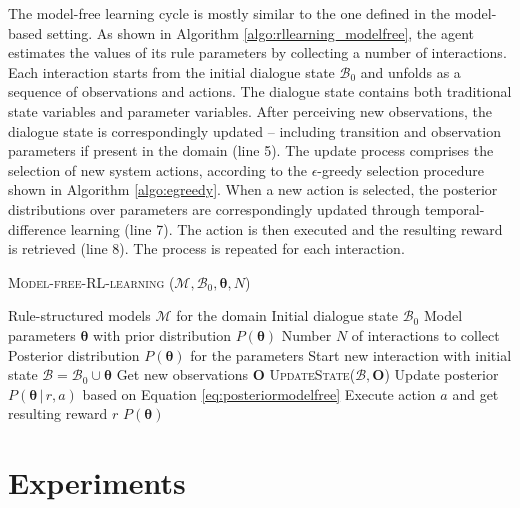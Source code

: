 The model-free learning cycle is mostly similar to the one defined in the model-based setting.  As shown in Algorithm \ref{algo:rllearning_modelfree}, the agent estimates the values of its rule parameters by collecting a number of interactions.  Each interaction starts from the initial dialogue state $\mathcal{B}_0$ and unfolds as a sequence of observations and actions.  The dialogue state contains both traditional state variables and parameter variables.  After perceiving new observations, the dialogue state is correspondingly updated -- including transition and observation parameters if present in the domain (line 5).  The update process comprises the selection of new system actions, according to the $\epsilon$-greedy selection procedure shown in Algorithm \ref{algo:egreedy}. When a new action is selected, the posterior distributions over parameters are correspondingly updated through temporal-difference learning (line 7). The action is then executed and the resulting reward is retrieved (line 8).  The process is repeated for each interaction. 


\begin{algorithm}[ht]
\caption{\textsc{Model-free-RL-learning} ($\mathcal{M}, \mathcal{B}_0, \boldsymbol\theta, N$)}
\begin{algorithmic}[1]\vspace{1mm}
\REQUIRE Rule-structured models $\mathcal{M}$ for the domain
\REQUIRE Initial dialogue state $\mathcal{B}_0$
\REQUIRE Model parameters $\boldsymbol\theta$ with prior distribution $P(\boldsymbol\theta)$
\REQUIRE Number $N$ of interactions to collect
\ENSURE Posterior distribution $P(\boldsymbol\theta)$ for the parameters  \vspace{1mm}
\STATE Start new interaction with initial state $\mathcal{B} = \mathcal{B}_0 \cup \boldsymbol\theta $
\STATE Get new observations $\mathbf{O}$
\STATE \textsc{UpdateState}($\mathcal{B}, \mathbf{O}$)
\STATE Update posterior $P(\boldsymbol\theta \, | \, r, a)$ based on Equation \eqref{eq:posteriormodelfree}
\STATE Execute action $a$ and get resulting reward $r$
\ENDIF
\ENDWHILE
\ENDFOR
\RETURN $P(\boldsymbol\theta)$
\end{algorithmic} 
\label{algo:rllearning_modelfree}
\end{algorithm}


\section{Experiments}
\label{sec:rllearning-experiments}

